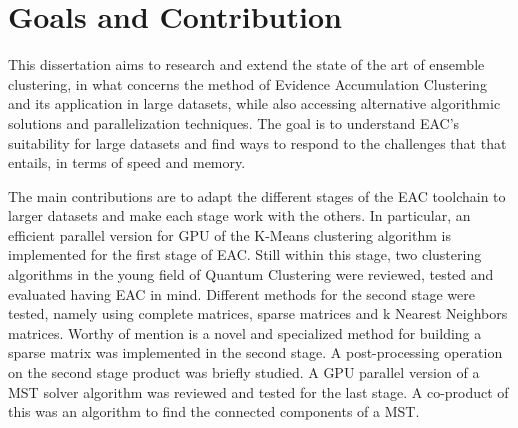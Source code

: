 
\section{Goals and Contribution}

This dissertation aims to research and extend the state of the art of ensemble clustering, in what concerns the method of Evidence Accumulation Clustering and its application in large datasets, while also accessing alternative algorithmic solutions and parallelization techniques.
The goal is to understand EAC's suitability for large datasets and find ways to respond to the challenges that that entails, in terms of speed and memory.

The main contributions are to adapt the different stages of the EAC toolchain to larger datasets and make each stage work with the others.
In particular, an efficient parallel version for GPU of the K-Means clustering algorithm is implemented for the first stage of EAC.
Still within this stage, two clustering algorithms in the young field of Quantum Clustering were reviewed, tested and evaluated having EAC in mind. %
Different methods for the second stage were tested, namely using complete matrices, sparse matrices and k Nearest Neighbors matrices.
Worthy of mention is a novel and specialized method for building a sparse matrix was implemented in the second stage. %
A post-processing operation on the second stage product was briefly studied. %
A GPU parallel version of a MST solver algorithm was reviewed and tested for the last stage.
A co-product of this was an algorithm to find the connected components of a MST.


